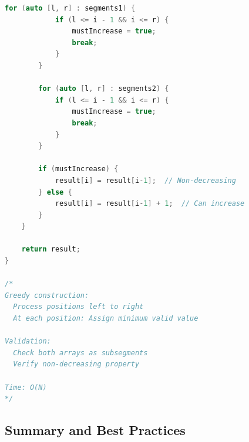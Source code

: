 \documentclass[11pt,a4paper,oneside]{book}
\begin{document}
\begin{lstlisting}[language=C++, caption=Complete Transformation Solutions - NEW PROBLEM]
        for (auto [l, r] : segments1) {
            if (l <= i - 1 && i <= r) {
                mustIncrease = true;
                break;
            }
        }
        
        for (auto [l, r] : segments2) {
            if (l <= i - 1 && i <= r) {
                mustIncrease = true;
                break;
            }
        }
        
        if (mustIncrease) {
            result[i] = result[i-1];  // Non-decreasing
        } else {
            result[i] = result[i-1] + 1;  // Can increase
        }
    }
    
    return result;
}

/*
Greedy construction:
  Process positions left to right
  At each position: Assign minimum valid value
  
Validation:
  Check both arrays as subsegments
  Verify non-decreasing property

Time: O(N)
*/
\end{lstlisting}

\subsection{Summary and Best Practices}
\end{document}

